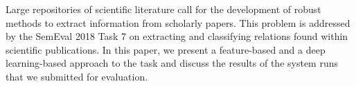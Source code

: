 Large repositories of scientific literature call for the development of robust methods to extract information from scholarly papers. This problem is addressed by the SemEval 2018 Task 7 on extracting and classifying relations found within scientific publications. In this paper, we present a feature-based and a deep learning-based approach to the task and discuss the results of the system runs that we submitted for evaluation.

